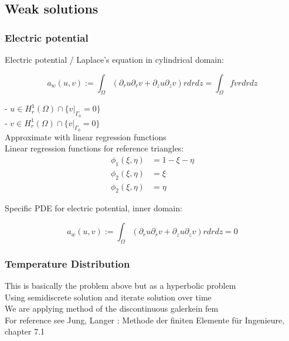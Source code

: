 \documentclass[parskip=half, titlepage=yes, 12pt, BCOR=12mm, DIV=calc]{scrartcl}
\begin{document}
\subsection{Weak solutions}
\subsubsection{Electric potential}

Electric potential / Laplace's equation in cylindrical domain:

\begin{equation}
    a_w(u,v) := \int_{\Omega} (\partial_r u \partial_r v + \partial_z u \partial_z v) r drdz = \int_{\Omega} f v r dr dz
\end{equation}

- $u \in H_r^1(\Omega) \cap \{v|_{\Gamma_{0}} = 0 \} $ \\
- $v \in H_r^1(\Omega) \cap \{v|_{\Gamma_{0}} = 0 \} $ \\

Approximate with linear regression functions\\
Linear regression functions for reference triangles:
\begin{align}
    \phi_1(\xi, \eta) &= 1 - \xi - \eta \\
    \phi_2(\xi, \eta) &= \xi \\
    \phi_2(\xi, \eta) &= \eta 
\end{align}

Specific PDE for electric potential, inner domain: 

\begin{equation}
    a_w(u,v) := \int_{\Omega} (\partial_r u \partial_r v + \partial_z u \partial_z v) r drdz = 0 
\end{equation}

\subsubsection{Temperature Distribution}

This is basically the problem above but as a hyperbolic problem \\
Using semidiscrete solution and iterate solution over time \\
We are applying method of the discontinuous galerkein fem \\
For reference see Jung, Langer : Methode der finiten Elemente für Ingenieure, chapter 7.1 \\
\end{document}
